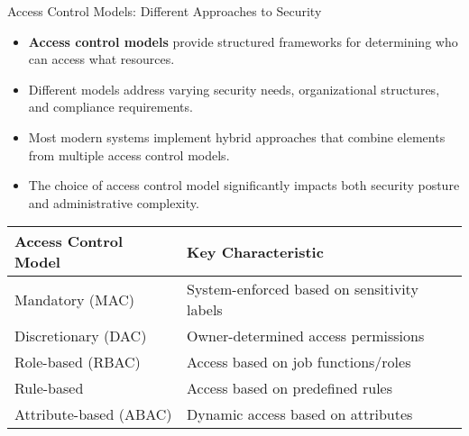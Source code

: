 \documentclass{beamer}
\begin{document}
\begin{frame}{Access Control Models: Different Approaches to Security}
    \begin{itemize}
        \item \textbf{Access control models} provide structured frameworks for determining who can access what resources.
        \item Different models address varying security needs, organizational structures, and compliance requirements.
        \item Most modern systems implement hybrid approaches that combine elements from multiple access control models.
        \item The choice of access control model significantly impacts both security posture and administrative complexity.
    \end{itemize}
    
    \begin{table}
        \begin{tabular}{|l|l|}
            \hline
            \textbf{Access Control Model} & \textbf{Key Characteristic} \\
            \hline
            Mandatory (MAC) & System-enforced based on sensitivity labels \\
            Discretionary (DAC) & Owner-determined access permissions \\
            Role-based (RBAC) & Access based on job functions/roles \\
            Rule-based & Access based on predefined rules \\
            Attribute-based (ABAC) & Dynamic access based on attributes \\
            \hline
        \end{tabular}
    \end{table}
\end{frame}
\end{document}
